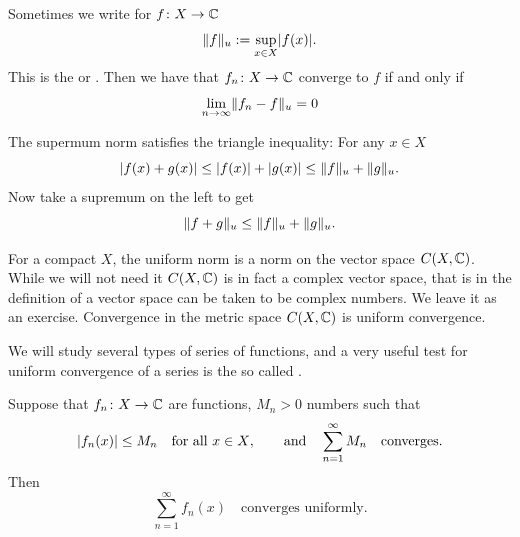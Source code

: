Sometimes we write for $f \colon X \to {\mathbb{C}}$
\begin{equation*}
\lVert {f} \rVert_u := \sup_{x \in X} \lvert {f(x)} \rvert .
\end{equation*}
This is the \emph{} or \emph{}.
Then we have that
$f_n \colon X \to {\mathbb{C}}$ converge to $f$ if and only if
\begin{equation*}
\lim_{n\to \infty} \lVert {f_n-f} \rVert_u = 0
\end{equation*}

The supermum norm satisfies the triangle inequality: For any $x \in X$
\begin{equation*}
\lvert {f(x)+g(x)} \rvert \leq
\lvert {f(x)} \rvert+\lvert {g(x)} \rvert \leq
\lVert {f} \rVert_u+\lVert {g} \rVert_u .
\end{equation*}
Now take a supremum on the left to get
\begin{equation*}
\lVert {f+g} \rVert_u \leq
\lVert {f} \rVert_u+\lVert {g} \rVert_u .
\end{equation*}

For a compact $X$,
the uniform norm is a norm on the vector space $C(X,{\mathbb{C}})$.
While we will not need it $C(X,{\mathbb{C}})$ is in fact a complex
vector space, that is in the definition of a vector space can be taken to be
complex numbers.
We leave it as
an exercise.
Convergence in the metric space $C(X,{\mathbb{C}})$ is
uniform convergence.

We will study several types of series of functions, and
a very useful test for uniform convergence of a series is the 
so called \emph{}.

\begin{thm} \label{thm:weiermtest}
Suppose that $f_n \colon X \to {\mathbb{C}}$ are functions, $M_n > 0$ numbers such
that
\begin{equation*}
\lvert {f_n(x)} \rvert\leq M_n \quad \text{for all $x \in X$},
\qquad \text{and} \quad
\sum_{n=1}^\infty M_n
\quad \text{converges}.
\end{equation*}
Then
\begin{equation*}
\sum_{n=1}^\infty f_n(x)
\quad \text{converges uniformly}.
\end{equation*}
\end{thm}

